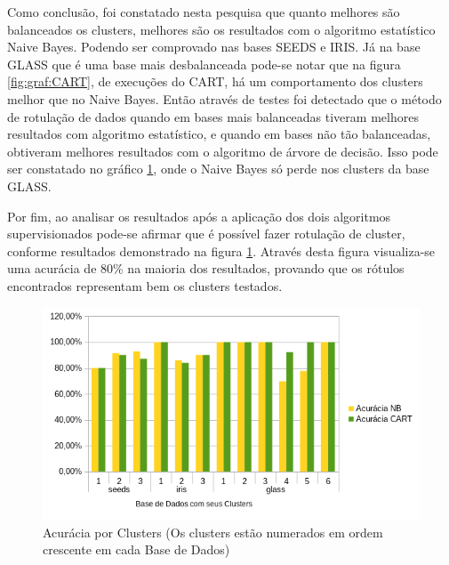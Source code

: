 Como conclusão, foi constatado nesta pesquisa que quanto melhores são balanceados os clusters, melhores são os resultados com o algoritmo estatístico Naive Bayes. Podendo ser comprovado nas bases SEEDS e IRIS. Já  na base GLASS que é uma base mais desbalanceada  pode-se notar que na figura \ref{fig:graf:CART}, de execuções do CART, há um comportamento dos clusters melhor que no Naive Bayes. Então através de testes foi detectado que o método de rotulação de dados quando em bases mais balanceadas tiveram melhores resultados com algoritmo estatístico, e quando em bases não tão balanceadas, obtiveram melhores resultados com o algoritmo de árvore de decisão. Isso pode ser constatado no gráfico \ref{fig:graf:grafico_NB_CART_acuracia}, onde o Naive Bayes só perde nos clusters da base GLASS.

Por fim, ao analisar os resultados após a aplicação dos dois algoritmos supervisionados pode-se afirmar que é possível fazer rotulação de cluster, conforme resultados demonstrado na figura \ref{fig:graf:grafico_NB_CART_acuracia}. Através desta figura visualiza-se uma acurácia de 80\% na maioria dos resultados, provando que os rótulos encontrados representam bem os clusters testados. %

\begin{figure}[h!]
    \centering
        
  \includegraphics[scale=1]{figs/grafico_NB_CART_acuracia.png}
  \caption{Acurácia por Clusters (Os clusters estão numerados em ordem crescente em cada Base de Dados)} \label{fig:graf:grafico_NB_CART_acuracia}
\end{figure}

